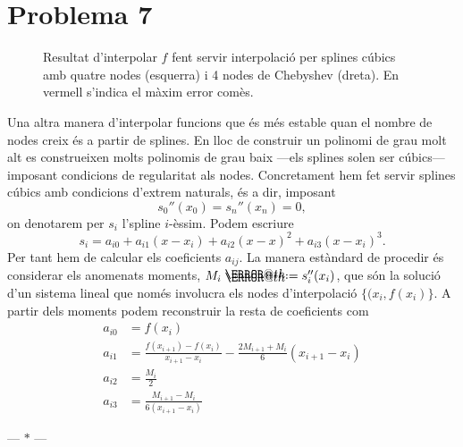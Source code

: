 \documentclass[12pt]{article}
\makeatletter
\numberwithin{table}{section}
\numberwithin{figure}{section}
\numberwithin{equation}{section}
\newcommand{\parbreak}{
	\begin{center}
		--- $\ast$ ---
	\end{center} 
}
\newcommand*{\defeq}{\mathrel{\rlap{%
    \raisebox{0.3ex}{$\m@th\cdot$}}%
  \raisebox{-0.3ex}{$\m@th\cdot$}}%
=}
\makeatother
\begin{document}
\newpage
\section{Problema 7}
\begin{figure}[b]
	\centering
	\sffamily \footnotesize
	
	\caption{Resultat d'interpolar \( f \) fent servir interpolació per splines cúbics amb quatre nodes (esquerra) i 4 nodes de Chebyshev (dreta). En vermell s'indica el màxim error comès.}
	\label{fig:splines}	
\end{figure}

Una altra manera d'interpolar funcions que és més estable quan el nombre de nodes creix és a partir de splines. En lloc de construir un polinomi de grau molt alt es construeixen molts polinomis de grau baix ---els splines solen ser cúbics--- imposant condicions de regularitat als nodes. Concretament hem fet servir splines cúbics amb condicions d'extrem naturals, és a dir, imposant
\begin{equation*}
	s_0''(x_0) = s_n''(x_n) = 0,
\end{equation*}
on denotarem per \( s_i \) l'spline \( i \)-èssim. Podem escriure
\begin{equation*}
	s_i = a_{i0} + a_{i1}(x-x_i) + a_{i2}(x-x)^2 + a_{i3}(x-x_i)^3.
\end{equation*}
Per tant hem de calcular els coeficients \( a_{ij} \). La manera estàndard de procedir és considerar els anomenats moments, \( M_i \defeq s_i''(x_i) \), que són la solució d'un sistema lineal que només involucra els nodes d'interpolació \( \{(x_i,f(x_i)\} \). A partir dels moments podem reconstruir la resta de coeficients com
\begin{equation} \label{eq:coeficients splines}
	\begin{aligned}
		a_{i0} & = f(x_i) \\
		a_{i1} & = \frac{f(x_{i+1}) - f(x_i)}{x_{i+1} - x_i} - \frac{2M_{i+1} + M_i}{6}(x_{i+1} - x_i) \\
		a_{i2} & = \frac{M_i}{2} \\
		a_{i3} & = \frac{M_{i+1} - M_i}{6(x_{i+1} - x_i)}
	\end{aligned} 
\end{equation}

\parbreak
\end{document}
